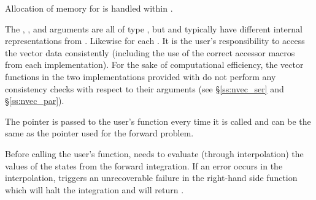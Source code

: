 {
  Allocation of memory for  is handled within {\cvodes}.

  The , , and  arguments are all of type ,
  but  and  typically have different internal representations
  from .  Likewise for each .  It is the user's
  responsibility to access the vector data consistently (including the use of the
  correct accessor macros from each {\nvector} implementation). For the sake of
  computational efficiency, the vector functions in the two {\nvector} implementations
  provided with {\cvodes} do not perform any consistency checks with respect to their
   arguments (see \S\ref{ss:nvec_ser} and \S\ref{ss:nvec_par}).

  The  pointer is passed to
  the user's  function every time it is called and can be the same as the
   pointer used for the forward problem.

  {\warn}Before calling the user's  function, {\cvodes} needs to evaluate
  (through interpolation) the values of the states from the forward integration.
  If an error occurs in the interpolation, {\cvodes} triggers an unrecoverable
  failure in the right-hand side function which will halt the integration and
   will return .
}


